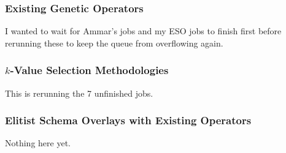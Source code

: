 \subsubsection*{Existing Genetic Operators}
I wanted to wait for Ammar's jobs and my ESO jobs to finish first before rerunning these to keep the queue from overflowing again.

\subsubsection*{$k$-Value Selection Methodologies}
This is rerunning the 7 unfinished jobs.

\subsubsection*{Elitist Schema Overlays with Existing Operators}
Nothing here yet.